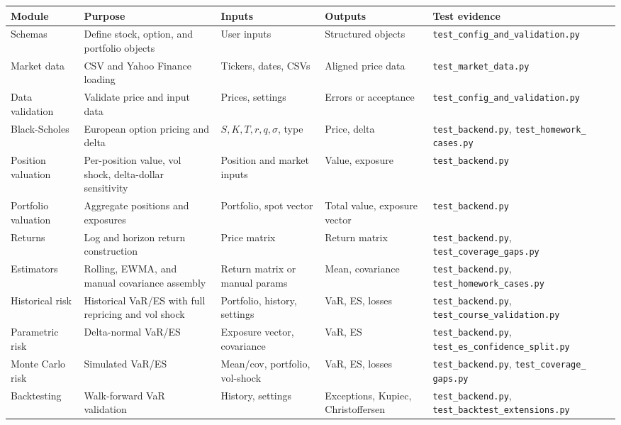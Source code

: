 \documentclass[11pt]{article}
\newcommand{\code}[1]{\texttt{#1}}
\begin{document}
\begin{center}
\footnotesize
\begin{tabular}{L{2.2cm}L{3.5cm}L{2.4cm}L{2.2cm}L{3.0cm}}
\toprule
\textbf{Module} & \textbf{Purpose} & \textbf{Inputs} & \textbf{Outputs} & \textbf{Test evidence} \\
\midrule
Schemas & Define stock, option, and portfolio objects & User inputs & Structured objects & \code{test\_config\_and\_\allowbreak validation.py} \\
Market data & CSV and Yahoo Finance loading & Tickers, dates, CSVs & Aligned price data & \code{test\_market\_data.py} \\
Data validation & Validate price and input data & Prices, settings & Errors or acceptance & \code{test\_config\_and\_\allowbreak validation.py} \\
Black-Scholes & European option pricing and delta & $S,K,T,r,q,\sigma$, type & Price, delta & \code{test\_backend.py}, \code{test\_homework\_ cases.py} \\
Position valuation & Per-position value, vol shock, delta-dollar sensitivity & Position and market inputs & Value, exposure & \code{test\_backend.py} \\
Portfolio valuation & Aggregate positions and exposures & Portfolio, spot vector & Total value, exposure vector & \code{test\_backend.py} \\
Returns & Log and horizon return construction & Price matrix & Return matrix & \code{test\_backend.py}, \code{test\_coverage\_gaps.py} \\
Estimators & Rolling, EWMA, and manual covariance assembly & Return matrix or manual params & Mean, covariance & \code{test\_backend.py}, \code{test\_homework\_cases.py} \\
Historical risk & Historical VaR/ES with full repricing and vol shock & Portfolio, history, settings & VaR, ES, losses & \code{test\_backend.py}, \code{test\_course\_\allowbreak validation.py} \\
Parametric risk & Delta-normal VaR/ES & Exposure vector, covariance & VaR, ES & \code{test\_backend.py}, \code{test\_es\_confidence\allowbreak\_split.py} \\
Monte Carlo risk & Simulated VaR/ES & Mean/cov, portfolio, vol-shock & VaR, ES, losses & \code{test\_backend.py}, \code{test\_coverage\_ gaps.py} \\
Backtesting & Walk-forward VaR validation & History, settings & Exceptions, Kupiec, Christoffersen & \code{test\_backend.py}, \code{test\_backtest\allowbreak\_extensions.py} \\

\end{tabular}
\end{center}
\end{document}
